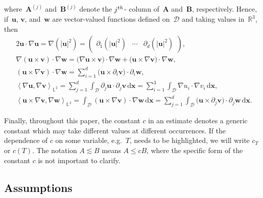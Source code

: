 \documentclass[11pt,reqno]{amsart}
\theoremstyle{definition}
\numberwithin{equation}{section}
\newcommand{\bff}{\boldsymbol}
\newcommand{\bb}{\mathbb}
\newcommand{\dx}{\mathrm{d}\bff{x}}
\newcommand{\pa}{\partial}
\newcommand{\inpro}[2]{\left\langle#1,#2\right\rangle}
\begin{document}
where~$\bff{A}^{(j)}$ and~$\bff{B}^{(j)}$ denote the $j^{\rm th}$- column
of~$\bff{A}$ and~$\bff{B}$, respectively.
Hence, if~$\bff{u}$, $\bff{v}$, and~$\bff{w}$ are
vector-valued functions defined on~$\mathscr{D}$ and taking values in~$\bb{R}^3$, then
\begin{equation}\label{equ:nab nab}
	\begin{aligned}
		&2\bff{u}\cdot\nabla\bff{u}
		=
		\nabla\left(|\bff{u}|^2\right)
		=
		\begin{pmatrix}
			\pa_1(|\bff{u}|^2) & \cdots & \pa_d(|\bff{u}|^2)
		\end{pmatrix},
		\\
		&\nabla(\bff{u}\times\bff{v})\cdot\nabla\bff{w}
		=
		\big(\nabla\bff{u}\times\bff{v}\big)\cdot\nabla\bff{w}
		+
		\big(\bff{u}\times\nabla\bff{v}\big)\cdot\nabla\bff{w},
		\\
		&(\bff{u}\times\nabla\bff{v})\cdot\nabla\bff{w}
		=
		\sum_{i=1}^d
		\big(
		\bff{u}\times\pa_i\bff{v}
		\big)
		\cdot
		\pa_i\bff{w},
		\\
		&\inpro{\nabla\bff{u}}{\nabla\bff{v}}_{\bb{L}^2}
		=
		\sum_{j=1}^d 
		\int_\mathscr{D} \pa_j\bff{u} \cdot \pa_j\bff{v} \,\dx
		=
		\sum_{i=1}^3
		\int_\mathscr{D} \nabla u_i \cdot \nabla v_i \,\dx,
		\\
		&\inpro{\bff{u}\times\nabla\bff{v}}{\nabla\bff{w}}_{\bb{L}^2}
		=
		\int_\mathscr{D} (\bff{u}\times\nabla\bff{v})\cdot\nabla\bff{w} \,\dx
		=
		\sum_{j=1}^d
		\int_\mathscr{D} \big(\bff{u}\times\pa_j\bff{v}\big)\cdot\pa_j\bff{w} \,\dx.
	\end{aligned}
\end{equation}

Finally, throughout this paper, the constant $c$ in an estimate denotes a
generic constant which may take different values at different occurrences. If
the dependence of $c$ on some variable, e.g.~$T$, needs to be highlighted, we will write
$c_T$ or $c(T)$. The notation $A \lesssim B$ means $A \le c B$, where the specific form of
the constant $c$ is not important to clarify.




\subsection{Assumptions}\label{sec:assum}
\end{document}
